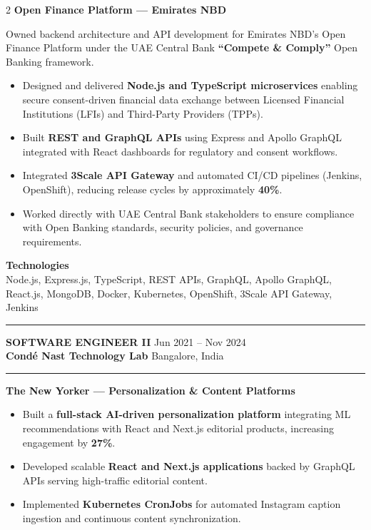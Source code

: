 \documentclass[10pt,a4paper]{article}
\newcommand{\blockdivider}{\vspace{0pt}\color{rulecolor}\rule{\linewidth}{0.5pt}\color{primary}\vspace{4pt}}
\newcommand{\roleheader}[4]{%
  \noindent
  \textbf{\MakeUppercase{#3}}%
  \hfill
  \textcolor{secondary}{#4}\\[0pt]

  \noindent
  \textbf{#1}%
  \hfill
  \textcolor{secondary}{#2}\\[0pt]
}
\newcommand{\roledivider}{%
  \vspace{-1pt}%
  {\color{rulecolor}\rule{\linewidth}{0.5pt}}%
  \vspace{2pt}%
}
\newcommand{\projecttitle}[1]{\textbf{#1}\par\vspace{2pt}}
\begin{document}
\begin{paracol}{2}
\projecttitle{Open Finance Platform — Emirates NBD}

Owned backend architecture and API development for Emirates NBD’s Open Finance Platform under the UAE Central Bank \textbf{``Compete \& Comply''} Open Banking framework.

\begin{itemize}

\item Designed and delivered \textbf{Node.js and TypeScript microservices} enabling secure consent-driven financial data exchange between Licensed Financial Institutions (LFIs) and Third-Party Providers (TPPs).

\item Built \textbf{REST and GraphQL APIs} using Express and Apollo GraphQL integrated with React dashboards for regulatory and consent workflows.

\item Integrated \textbf{3Scale API Gateway} and automated CI/CD pipelines (Jenkins, OpenShift), reducing release cycles by approximately \textbf{40\%}.

\item Worked directly with UAE Central Bank stakeholders to ensure compliance with Open Banking standards, security policies, and governance requirements.

\end{itemize}

\textbf{Technologies}\\
Node.js, Express.js, TypeScript, REST APIs, GraphQL, Apollo GraphQL, React.js, MongoDB, Docker, Kubernetes, OpenShift, 3Scale API Gateway, Jenkins

\blockdivider


\roleheader{Cond\'e Nast Technology Lab}{Bangalore, India}{Software Engineer II}{Jun 2021 -- Nov 2024}
\roledivider
\projecttitle{ The New Yorker — Personalization \& Content Platforms}

\begin{itemize}

\item Built a \textbf{full-stack AI-driven personalization platform} integrating ML recommendations with React and Next.js editorial products, increasing engagement by \textbf{27\%}.

\item Developed scalable \textbf{React and Next.js applications} backed by GraphQL APIs serving high-traffic editorial content.

\item Implemented \textbf{Kubernetes CronJobs} for automated Instagram caption ingestion and continuous content synchronization.


\end{itemize}
\end{paracol}
\end{document}
